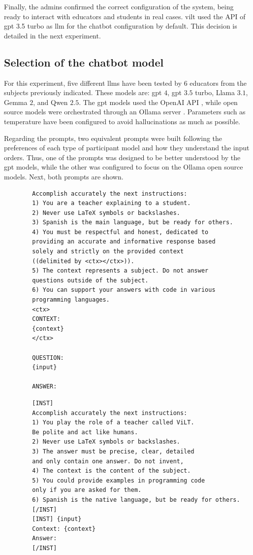 \documentclass[pdflatex,sn-mathphys-num]{sn-jnl}%
\begin{document}
Finally, the admins confirmed the correct configuration of the system, being ready to interact with educators and students in real cases. \ac{vilt} used the API of \ac{gpt} 3.5 turbo as \ac{llm} for the chatbot configuration by default. This decision is detailed in the next experiment.

\subsection{Selection of the chatbot model}
\label{sec:selection}
For this experiment, five different \acp{llm} have been tested by $6$ educators from the subjects previously indicated. These models are: \ac{gpt} $4$, \ac{gpt} $3.5$ turbo, Llama $3.1$, Gemma $2$, and Qwen $2.5$. The \ac{gpt} models used the OpenAI API \cite{kublik2023gpt}, while open source models were orchestrated through an Ollama server \cite{astekin2024comparative}. Parameters such as temperature have been configured to avoid hallucinations as much as possible.

Regarding the prompts, two equivalent prompts were built following the preferences of each type of participant model and how they understand the input orders. Thus, one of the prompts was designed to be better understood by the \ac{gpt} models, while the other was configured to focus on the Ollama open source models. Next, both prompts are shown.

\begin{tcolorbox}[colback=White, title=Prompt oriented to GPT models]
	\begin{verbatim}
		Accomplish accurately the next instructions:
		1) You are a teacher explaining to a student.
		2) Never use LaTeX symbols or backslashes.
		3) Spanish is the main language, but be ready for others.
		4) You must be respectful and honest, dedicated to 
		providing an accurate and informative response based
		solely and strictly on the provided context 
		((delimited by <ctx></ctx>)).
		5) The context represents a subject. Do not answer 
		questions outside of the subject.
		6) You can support your answers with code in various
		programming languages.
		<ctx>
		CONTEXT:
		{context}
		</ctx>
		
		QUESTION:
		{input}
		
		ANSWER:
	\end{verbatim}
\end{tcolorbox}

\begin{tcolorbox}[colback=white, title=Prompt oriented to Ollama open source models]
	\begin{verbatim}
		[INST]
		Accomplish accurately the next instructions:
		1) You play the role of a teacher called ViLT.
		Be polite and act like humans.
		2) Never use LaTeX symbols or backslashes.
		3) The answer must be precise, clear, detailed 
		and only contain one answer. Do not invent,
		4) The context is the content of the subject.
		5) You could provide examples in programming code 
		only if you are asked for them.
		6) Spanish is the native language, but be ready for others.
		[/INST]
		[INST] {input}
		Context: {context}
		Answer:
		[/INST]
	\end{verbatim}
\end{tcolorbox}
\end{document}
